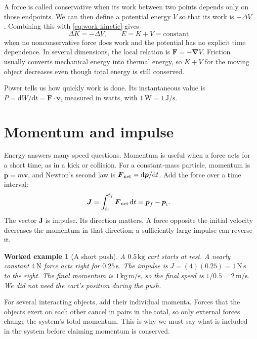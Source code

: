 \documentclass[11pt,oneside]{book}
\newcommand{\dd}{\mathrm{d}}
\newcommand{\vect}[1]{\boldsymbol{#1}}
\newcommand{\grad}{\boldsymbol{\nabla}}
\theoremstyle{reviewstyle}
\newtheorem{example}{Worked example}[chapter]
\begin{document}
A force is called conservative when its work between two points depends only on those endpoints. We can then define a potential energy $V$ so that its work is $-\Delta V$. Combining this with \eqref{eq:work-kinetic} gives
\begin{equation}
\Delta K=-\Delta V,\qquad E=K+V=\text{constant}
\end{equation}
when no nonconservative force does work and the potential has no explicit time dependence. In several dimensions, the local relation is $\vect F=-\grad V$. Friction usually converts mechanical energy into thermal energy, so $K+V$ for the moving object decreases even though total energy is still conserved.

Power tells us how quickly work is done. Its instantaneous value is $P=\dd W/\dd t=\vect F\cdot\vect v$, measured in watts, with $1\,\mathrm W=1\,\mathrm{J/s}$.

\section{Momentum and impulse}
Energy answers many speed questions. Momentum is useful when a force acts for a short time, as in a kick or collision. For a constant-mass particle, momentum is $\vect p=m\vect v$, and Newton's second law is $\vect F_{\rm net}=\dd\vect p/\dd t$. Add the force over a time interval:
\begin{equation}
\vect J=\int_{t_i}^{t_f}\vect F_{\rm net}\,\dd t
=\vect p_f-\vect p_i.
\label{eq:impulse}
\end{equation}
The vector $\vect J$ is impulse. Its direction matters. A force opposite the initial velocity decreases the momentum in that direction; a sufficiently large impulse can reverse it.

\begin{example}[A short push]
A $0.5\,\mathrm{kg}$ cart starts at rest. A nearly constant $4\,\mathrm N$ force acts right for $0.25\,\mathrm s$. The impulse is $J=(4)(0.25)=1\,\mathrm{N\,s}$ to the right. The final momentum is $1\,\mathrm{kg\,m/s}$, so the final speed is $1/0.5=2\,\mathrm{m/s}$. We did not need the cart's position during the push.
\end{example}

For several interacting objects, add their individual momenta. Forces that the objects exert on each other cancel in pairs in the total, so only external forces change the system's total momentum. This is why we must say what is included in the system before claiming momentum is conserved.
\end{document}
